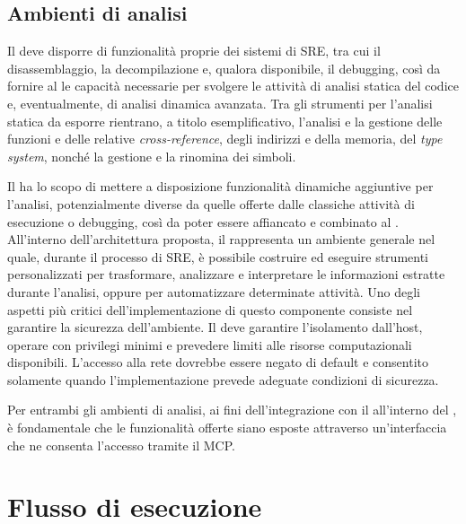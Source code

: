 \subsection{Ambienti di analisi} %

Il \sreframework{} deve disporre di funzionalità proprie dei sistemi di SRE, tra cui il disassemblaggio, la decompilazione e, qualora disponibile, il debugging, così da fornire al \sreagent{} le capacità necessarie per svolgere le attività di analisi statica del codice e, eventualmente, di analisi dinamica avanzata. Tra gli strumenti per l'analisi statica da esporre rientrano, a titolo esemplificativo, l'analisi e la gestione delle funzioni e delle relative \emph{cross-reference}, degli indirizzi e della memoria, del \emph{type system}, nonché la gestione e la rinomina dei simboli. 

Il \sandbox{} ha lo scopo di mettere a disposizione funzionalità dinamiche aggiuntive per l'analisi, potenzialmente diverse da quelle offerte dalle classiche attività di esecuzione o debugging, così da poter essere affiancato e combinato al \sreframework. All'interno dell'architettura proposta, il \sandbox{} rappresenta un ambiente generale nel quale, durante il processo di SRE, è possibile costruire ed eseguire strumenti personalizzati per trasformare, analizzare e interpretare le informazioni estratte durante l'analisi, oppure per automatizzare determinate attività. Uno degli aspetti più critici dell'implementazione di questo componente consiste nel garantire la sicurezza dell'ambiente. Il \sandbox{} deve garantire l'isolamento dall'host, operare con privilegi minimi e prevedere limiti alle risorse computazionali disponibili. L'accesso alla rete dovrebbe essere negato di default e consentito solamente quando l'implementazione prevede adeguate condizioni di sicurezza.


Per entrambi gli ambienti di analisi, ai fini dell'integrazione con il \llm{} all'interno del \sreagent{}, è fondamentale che le funzionalità offerte siano esposte attraverso un'interfaccia che ne consenta l'accesso tramite il MCP. %

\section{Flusso di esecuzione} %

